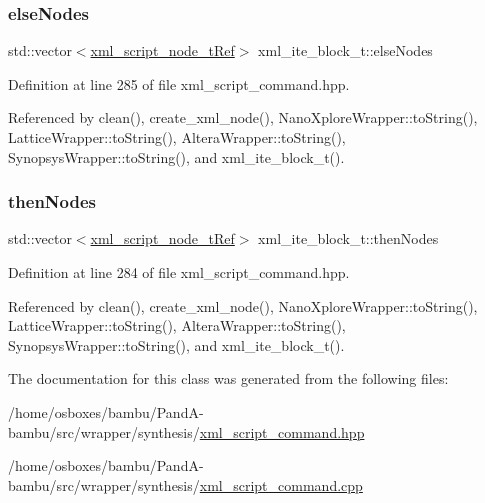 \mbox{\label{classxml__ite__block__t_a785fdef43d80828f6e2c3424fe8dec46}} 
\subsubsection{\texorpdfstring{else\+Nodes}{elseNodes}}
{\footnotesize\ttfamily std\+::vector$<$\hyperlink{xml__script__command_8hpp_a1fe3d50ade66bc35e41be9b68bbbcd02}{xml\+\_\+script\+\_\+node\+\_\+t\+Ref}$>$ xml\+\_\+ite\+\_\+block\+\_\+t\+::else\+Nodes}



Definition at line 285 of file xml\+\_\+script\+\_\+command.\+hpp.



Referenced by clean(), create\+\_\+xml\+\_\+node(), Nano\+Xplore\+Wrapper\+::to\+String(), Lattice\+Wrapper\+::to\+String(), Altera\+Wrapper\+::to\+String(), Synopsys\+Wrapper\+::to\+String(), and xml\+\_\+ite\+\_\+block\+\_\+t().

\mbox{\label{classxml__ite__block__t_add9208d8134ef496e5162efb73f89db3}} 
\subsubsection{\texorpdfstring{then\+Nodes}{thenNodes}}
{\footnotesize\ttfamily std\+::vector$<$\hyperlink{xml__script__command_8hpp_a1fe3d50ade66bc35e41be9b68bbbcd02}{xml\+\_\+script\+\_\+node\+\_\+t\+Ref}$>$ xml\+\_\+ite\+\_\+block\+\_\+t\+::then\+Nodes}



Definition at line 284 of file xml\+\_\+script\+\_\+command.\+hpp.



Referenced by clean(), create\+\_\+xml\+\_\+node(), Nano\+Xplore\+Wrapper\+::to\+String(), Lattice\+Wrapper\+::to\+String(), Altera\+Wrapper\+::to\+String(), Synopsys\+Wrapper\+::to\+String(), and xml\+\_\+ite\+\_\+block\+\_\+t().



The documentation for this class was generated from the following files\+:\begin{DoxyCompactItemize}
\item 
/home/osboxes/bambu/\+Pand\+A-\/bambu/src/wrapper/synthesis/\hyperlink{xml__script__command_8hpp}{xml\+\_\+script\+\_\+command.\+hpp}\item 
/home/osboxes/bambu/\+Pand\+A-\/bambu/src/wrapper/synthesis/\hyperlink{xml__script__command_8cpp}{xml\+\_\+script\+\_\+command.\+cpp}\end{DoxyCompactItemize}
